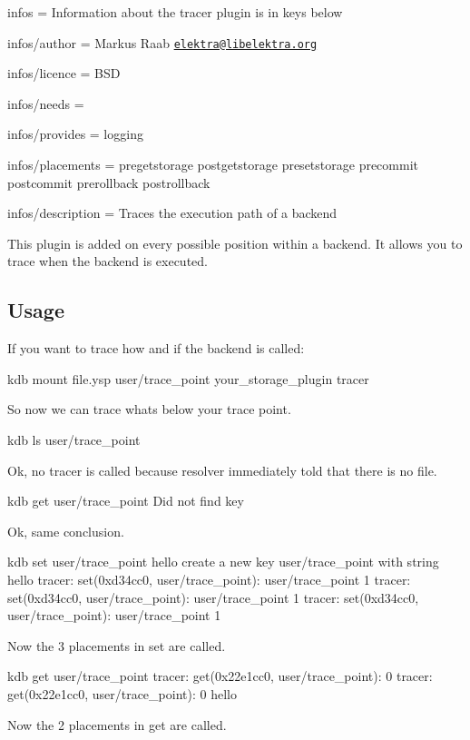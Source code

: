 
\begin{DoxyItemize}
\item infos = Information about the tracer plugin is in keys below
\item infos/author = Markus Raab \href{mailto:elektra@libelektra.org}{\tt elektra@libelektra.\+org}
\item infos/licence = B\+S\+D
\item infos/needs =
\item infos/provides = logging
\item infos/placements = pregetstorage postgetstorage presetstorage precommit postcommit prerollback postrollback
\item infos/description = Traces the execution path of a backend
\end{DoxyItemize}

This plugin is added on every possible position within a backend. It allows you to trace when the backend is executed.

\subsection*{Usage}

If you want to trace how and if the backend is called\+: \begin{DoxyVerb}kdb mount file.ysp user/trace_point your_storage_plugin tracer
\end{DoxyVerb}


So now we can trace whats below your trace point. \begin{DoxyVerb}kdb ls user/trace_point
\end{DoxyVerb}


Ok, no tracer is called because resolver immediately told that there is no file. \begin{DoxyVerb}kdb get user/trace_point
Did not find key
\end{DoxyVerb}


Ok, same conclusion. \begin{DoxyVerb}kdb set user/trace_point hello
create a new key user/trace_point with string hello
tracer: set(0xd34cc0, user/trace_point): user/trace_point 1
tracer: set(0xd34cc0, user/trace_point): user/trace_point 1
tracer: set(0xd34cc0, user/trace_point): user/trace_point 1
\end{DoxyVerb}


Now the 3 placements in set are called. \begin{DoxyVerb}kdb get user/trace_point
tracer: get(0x22e1cc0, user/trace_point): 0
tracer: get(0x22e1cc0, user/trace_point): 0
hello
\end{DoxyVerb}


Now the 2 placements in get are called. 